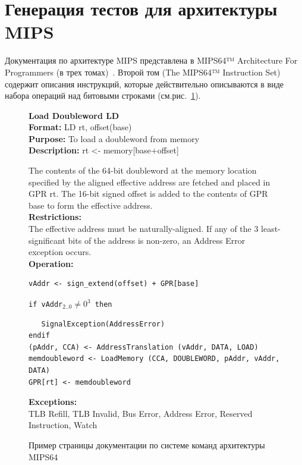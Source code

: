 \section{Генерация тестов для архитектуры MIPS}


Документация по архитектуре MIPS представлена в MIPS64™ Architecture For Programmers (в трех томах)~\cite{mips64}. Второй том (The MIPS64™ Instruction Set) содержит описания инструкций, которые действительно описываются в виде набора операций над битовыми строками (см.рис.~\ref{fig:mips64_page}).

\begin{figure}
\textbf{Load Doubleword    LD}\\

\textbf{Format:} LD rt, offset(base)\\

\textbf{Purpose:} To load a doubleword from memory\\

\textbf{Description:} rt <- memory[base+offset]

The contents of the 64-bit doubleword at the memory location specified by the aligned effective address are fetched and placed in GPR rt. The 16-bit signed offset is added to the contents of GPR base to form the effective address.\\

\textbf{Restrictions:}\\
The effective address must be naturally-aligned. If any of the 3 least-significant bits of the address is non-zero, an Address Error exception occurs.\\

\textbf{Operation:}
\begin{verbatim}
vAddr <- sign_extend(offset) + GPR[base]
\end{verbatim}
\texttt{if vAddr$_{2..0} \neq 0^3$ then}
\begin{verbatim}
   SignalException(AddressError)
endif
(pAddr, CCA) <- AddressTranslation (vAddr, DATA, LOAD)
memdoubleword <- LoadMemory (CCA, DOUBLEWORD, pAddr, vAddr, DATA)
GPR[rt] <- memdoubleword
\end{verbatim}

\textbf{Exceptions:}\\
TLB Refill, TLB Invalid, Bus Error, Address Error, Reserved Instruction, Watch

\caption{Пример страницы документации по системе команд архитектуры MIPS64}\label{fig:mips64_page}
\end{figure}

